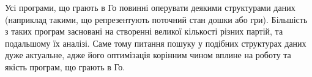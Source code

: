 
Усі програми, що грають в Го повинні оперувати деякими структурами даних (наприклад такими, що репрезентують поточний стан дошки або гри). Більшість з таких програм засновані на створенні великої кількості різних партій, та подальшому їх аналізі. Саме тому питання пошуку у подібних структурах даних дуже актуальне, адже його оптимізація корінним чином вплине на роботу та якість програм, що грають в Го.
